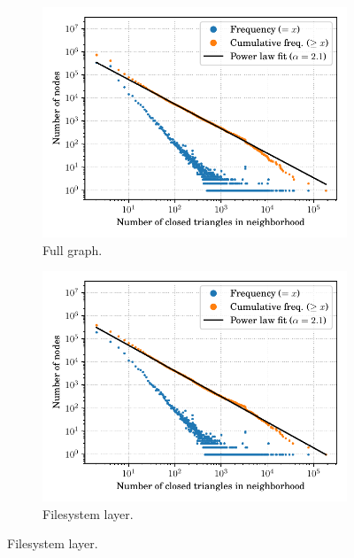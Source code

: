 \begin{figure}
    \begin{subfigure}{.49\textwidth}
        \centering
        \includegraphics[width=\linewidth]{img/topology/clusteringcoeff/full}
        \caption{Full graph.}
        \label{fig:clustering_full}
    \end{subfigure}\hfill
    \begin{subfigure}{.49\textwidth}
        \centering
        \includegraphics[width=\linewidth]{img/topology/clusteringcoeff/dir+cnt}
        \caption{Filesystem layer.}
        \label{fig:clustering_dir+cnt}
    \end{subfigure}
    \newline

\end{figure}
